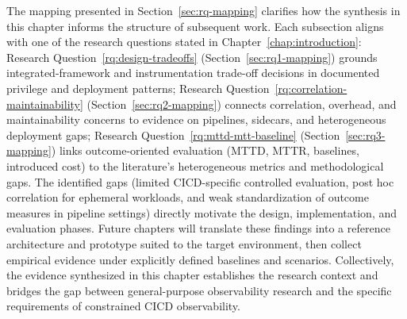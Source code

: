 The mapping presented in Section~\ref{sec:rq-mapping} clarifies how the synthesis in this chapter informs the structure of subsequent work. Each subsection aligns with one of the research questions stated in Chapter~\ref{chap:introduction}: Research Question~\ref{rq:design-tradeoffs} (Section~\ref{sec:rq1-mapping}) grounds integrated-framework and instrumentation trade-off decisions in documented privilege and deployment patterns; Research Question~\ref{rq:correlation-maintainability} (Section~\ref{sec:rq2-mapping}) connects correlation, overhead, and maintainability concerns to evidence on pipelines, sidecars, and heterogeneous deployment gaps; Research Question~\ref{rq:mttd-mtt-baseline} (Section~\ref{sec:rq3-mapping}) links outcome-oriented evaluation (\ac{MTTD}, \ac{MTTR}, baselines, introduced cost) to the literature's heterogeneous metrics and methodological gaps. The identified gaps (limited \ac{CICD}-specific controlled evaluation, post hoc correlation for ephemeral workloads, and weak standardization of outcome measures in pipeline settings) directly motivate the design, implementation, and evaluation phases. Future chapters will translate these findings into a reference architecture and prototype suited to the target environment, then collect empirical evidence under explicitly defined baselines and scenarios. Collectively, the evidence synthesized in this chapter establishes the research context and bridges the gap between general-purpose observability research and the specific requirements of constrained \ac{CICD} observability.